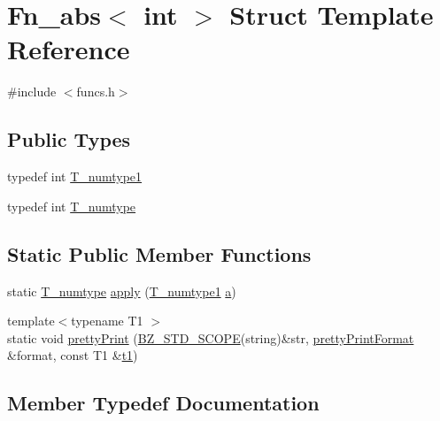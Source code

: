 \hypertarget{structFn__abs_3_01int_01_4}{}\section{Fn\+\_\+abs$<$ int $>$ Struct Template Reference}
\label{structFn__abs_3_01int_01_4}


{\ttfamily \#include $<$funcs.\+h$>$}

\subsection*{Public Types}
\begin{DoxyCompactItemize}
\item 
typedef int \hyperlink{structFn__abs_3_01int_01_4_a901973b0c014abb3371f5e1ae7990312}{T\+\_\+numtype1}
\item 
typedef int \hyperlink{structFn__abs_3_01int_01_4_aad48454317943a5d0d5b8af4cf7d30d4}{T\+\_\+numtype}
\end{DoxyCompactItemize}
\subsection*{Static Public Member Functions}
\begin{DoxyCompactItemize}
\item 
static \hyperlink{structFn__abs_3_01int_01_4_aad48454317943a5d0d5b8af4cf7d30d4}{T\+\_\+numtype} \hyperlink{structFn__abs_3_01int_01_4_aa4cefe6d6d5d06a6764b018f1798b04f}{apply} (\hyperlink{structFn__abs_3_01int_01_4_a901973b0c014abb3371f5e1ae7990312}{T\+\_\+numtype1} \hyperlink{gen__mat5files_8m_aae328bf20413f220e38aec4d95bfd6da}{a})
\item 
{\footnotesize template$<$typename T1 $>$ }\\static void \hyperlink{structFn__abs_3_01int_01_4_a78aa632f586a52785cc8030ab7c13597}{pretty\+Print} (\hyperlink{numinquire_8h_a2b24ffc3b4ef9803956bc7715c6c7b83}{B\+Z\+\_\+\+S\+T\+D\+\_\+\+S\+C\+O\+P\+E}(string)\&str, \hyperlink{classprettyPrintFormat}{pretty\+Print\+Format} \&format, const T1 \&\hyperlink{sparse_2linalg_2eigen_2arpack_2ARPACK_2SRC_2stat_8h_af377a4e2b03dbeb6590856bdfca3df30}{t1})
\end{DoxyCompactItemize}


\subsection{Member Typedef Documentation}
\hypertarget{structFn__abs_3_01int_01_4_aad48454317943a5d0d5b8af4cf7d30d4}{}
